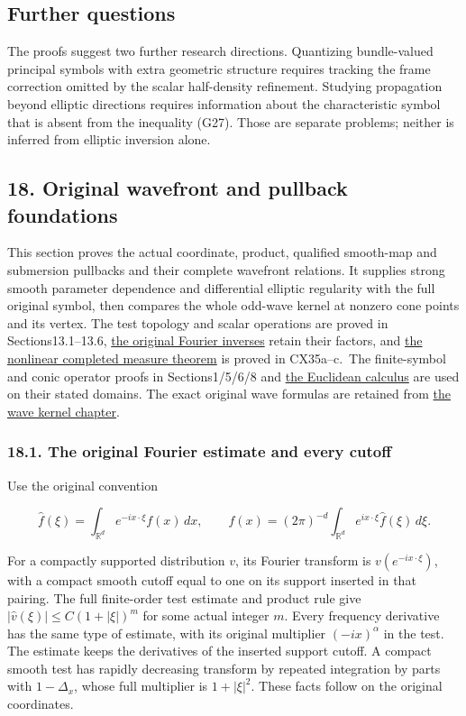 \documentclass[
  11pt,
]{article}
\begin{document}
\subsection{Further questions}\label{further-questions}

The proofs suggest two further research directions. Quantizing
bundle-valued principal symbols with extra geometric structure requires
tracking the frame correction omitted by the scalar half-density
refinement. Studying propagation beyond elliptic directions requires
information about the characteristic symbol that is absent from the
inequality (G27). Those are separate problems; neither is inferred from
elliptic inversion alone.

\subsection{18. Original wavefront and pullback
foundations}\label{original-wavefront-and-pullback-foundations}

This section proves the actual coordinate, product, qualified smooth-map
and submersion pullbacks and their complete wavefront relations. It
supplies strong smooth parameter dependence and differential elliptic
regularity with the full original symbol, then compares the whole
odd-wave kernel at nonzero cone points and its vertex. The test topology
and scalar operations are proved in Sections13.1--13.6,
\href{prerequisite-bridges.pdf}{the original Fourier inverses} retain
their factors, and \href{conormal-transmission.pdf}{the nonlinear
completed measure theorem} is proved in CX35a--c.~The finite-symbol and
conic operator proofs in Sections1/5/6/8 and
\href{euclidean-symbol-calculus.pdf}{the Euclidean calculus} are used on
their stated domains. The exact original wave formulas are retained from
\href{wave-hadamard-kernels.pdf}{the wave kernel chapter}.

\subsubsection{18.1. The original Fourier estimate and every
cutoff}\label{the-original-fourier-estimate-and-every-cutoff}

Use the original convention

\[
\widehat f(\xi)=\int_{\mathbb R^d}e^{-ix\cdot\xi}f(x)\,dx,\qquad
f(x)=(2\pi)^{-d}\int_{\mathbb R^d}e^{ix\cdot\xi}\widehat f(\xi)\,d\xi.
\tag{WF1}
\]

For a compactly supported distribution \(v\), its Fourier transform is
\(v(e^{-ix\cdot\xi})\), with a compact smooth cutoff equal to one on its
support inserted in that pairing. The full finite-order test estimate
and product rule give \(|\widehat v(\xi)|\leq C(1+|\xi|)^m\) for some
actual integer \(m\). Every frequency derivative has the same type of
estimate, with its original multiplier \((-ix)^\alpha\) in the test. The
estimate keeps the derivatives of the inserted support cutoff. A compact
smooth test has rapidly decreasing transform by repeated integration by
parts with \(1-\Delta_x\), whose full multiplier is \(1+|\xi|^2\). These
facts follow on the original coordinates.
\end{document}
